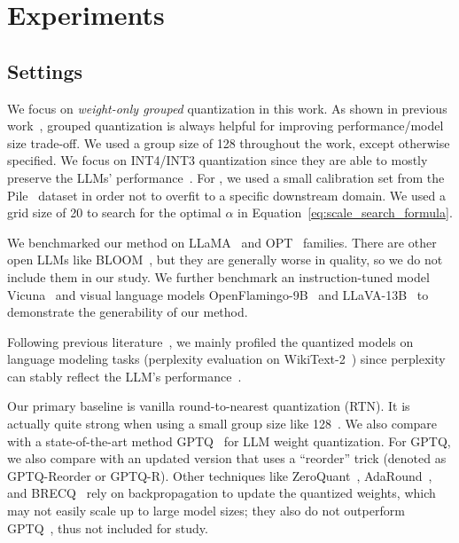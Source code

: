 \section{Experiments}




\subsection{Settings}

 We focus on \emph{weight-only grouped} quantization in this work. As shown in previous work~\cite{dettmers2022case, frantar2022gptq}, grouped quantization is always helpful for improving performance/model size trade-off. We used a group size of 128 throughout the work, except otherwise specified. We focus on INT4/INT3 quantization since they are able to mostly preserve the LLMs' performance~\cite{dettmers2022case}. For \methodshort, we used a small calibration set from the Pile~\cite{gao2020pile} dataset in order not to overfit to a specific downstream domain. We used a grid size of 20 to search for the optimal $\alpha$ in Equation~\ref{eq:scale_search_formula}. 

 We benchmarked our method on LLaMA~\cite{touvron2023llama} and OPT~\cite{opt} families. There are other open LLMs like BLOOM~\cite{scao2022bloom}, but they are generally worse in quality, so we do not include them in our study. We further benchmark an instruction-tuned model Vicuna~\cite{vicuna2023} and visual language models OpenFlamingo-9B~\cite{openflamingo} and LLaVA-13B~\cite{liu2023llava} to demonstrate the generability of our method. 

 Following previous literature~\cite{dettmers2022llmint8, xiao2022smoothquant, frantar2022gptq, dettmers2022case, zeroquant}, we mainly profiled the quantized models on language modeling tasks (perplexity evaluation on WikiText-2~\cite{merity2016pointer}) since perplexity can stably reflect the LLM's performance~\cite{dettmers2022case}.

 Our primary baseline is vanilla round-to-nearest quantization (RTN). It is actually quite strong when using a small group size like 128~\cite{frantar2022gptq, dettmers2022case}. We also compare with a state-of-the-art method GPTQ~\cite{frantar2022gptq} for LLM weight quantization. For GPTQ, we also compare with an updated version that uses a ``reorder'' trick (denoted as GPTQ-Reorder or GPTQ-R). Other techniques like ZeroQuant~\cite{zeroquant}, AdaRound~\cite{nagel2020up}, and BRECQ~\cite{li2021brecq} rely on backpropagation to update the quantized weights, which may not easily scale up to large model sizes; they also do not outperform GPTQ~\cite{frantar2022gptq}, thus not included for study. 


